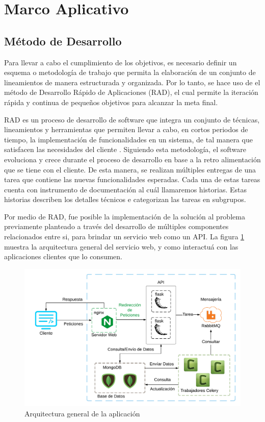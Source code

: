 \section{Marco Aplicativo}

\subsection{Método de Desarrollo}

Para llevar a cabo el cumplimiento de los objetivos, es necesario definir un esquema o metodología de trabajo que permita la elaboración de un conjunto de
lineamientos de manera estructurada y organizada.
Por lo tanto, se hace uso de el método de Desarrollo Rápido de Aplicaciones (RAD), el cual permite la iteración rápida y continua de pequeños objetivos para alcanzar la meta final.

RAD es un proceso de desarrollo de software que
integra un conjunto de técnicas, lineamientos y herramientas que permiten llevar a cabo, en
cortos periodos de tiempo, la implementación de funcionalidades en un sistema, de tal manera que
satisfacen las necesidades del cliente \cite{23}.
Siguiendo esta metodología, el software evoluciona y crece durante el proceso de desarrollo en base a la retro alimentación que se tiene con el cliente.
De esta manera, se realizan múltiples entregas de una tarea que
contiene las nuevas funcionalidades esperadas.
Cada una de estas tareas cuenta con instrumento de documentación al cuál llamaremos historias.
Estas historias describen los detalles técnicos e categorizan las tareas en subgrupos.

Por medio de RAD, fue posible la implementación de la solución al problema previamente planteado a través del desarrollo de múltiples componentes relacionados entre si, para
brindar un servicio web como un API.
La figura \ref{fig:diagram_general} muestra la arquitectura general del servicio web, y como interactuá con las aplicaciones clientes que lo consumen.

\begin{figure}[H]
	\centering
		\includegraphics[width=1\textwidth]{figures/diagram_general}
	\caption{Arquitectura general de la aplicación}
	\label{fig:diagram_general}
\end{figure}

